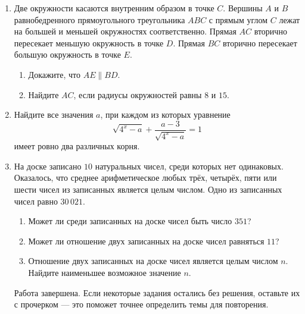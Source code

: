 \documentclass[a4paper,12pt]{article}
\begin{document}
\begin{enumerate}[resume]

\item Две окружности касаются внутренним образом в точке $C$.
Вершины $A$ и $B$ равнобедренного прямоугольного треугольника $ABC$
с прямым углом $C$ лежат на большей и меньшей окружностях соответственно.
Прямая $AC$ вторично пересекает меньшую окружность в точке $D$.
Прямая $BC$ вторично пересекает большую окружность в точке $E$.

\begin{enumerate}[
  label=\alph*),
  leftmargin=8mm,
  itemsep=0.35em,
  topsep=0.35em
]
  \item Докажите, что $AE\parallel BD$.
  \item Найдите $AC$, если радиусы окружностей равны $8$ и $15$.
\end{enumerate}
\vspace{1.8cm}

\item Найдите все значения $a$, при каждом из которых уравнение
\[
\sqrt{4^x-a}+\frac{a-3}{\sqrt{4^x-a}}=1
\]
имеет ровно два различных корня.
\vspace{2.0cm}

\item На доске записано $10$ натуральных чисел, среди которых нет
одинаковых. Оказалось, что среднее арифметическое любых трёх, четырёх,
пяти или шести чисел из записанных является целым числом. Одно из
записанных чисел равно $30\,021$.

\begin{enumerate}[
  label=\alph*),
  leftmargin=8mm,
  itemsep=0.35em,
  topsep=0.35em
]
  \item Может ли среди записанных на доске чисел быть число $351$?
  \item Может ли отношение двух записанных на доске чисел равняться $11$?
  \item Отношение двух записанных на доске чисел является целым числом
  $n$. Найдите наименьшее возможное значение $n$.
\end{enumerate}

\vfill

{\small\color{soft}
Работа завершена. Если некоторые задания остались без решения,
оставьте их с прочерком --- это поможет точнее определить темы
для повторения.}

\end{enumerate}
\end{document}
